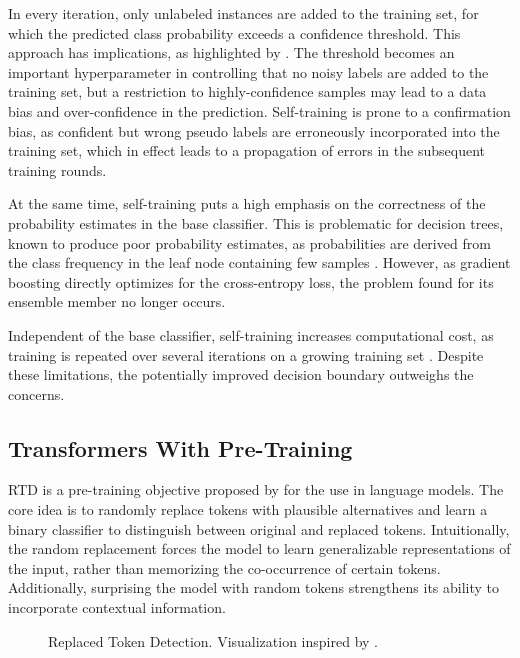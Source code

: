 In every iteration, only unlabeled instances are added to the training set, for which the predicted class probability exceeds a confidence threshold. This approach has implications, as highlighted by \textcite[][32427]{chenDebiasedSelfTrainingSemiSupervised2022}. The threshold becomes an important hyperparameter in controlling that no noisy labels are added to the training set, but a restriction to highly-confidence samples may lead to a data bias and over-confidence in the prediction. Self-training is prone to a confirmation bias, as confident but wrong pseudo labels are erroneously incorporated into the training set, which in effect leads to a propagation of errors in the subsequent training rounds.

At the same time, self-training puts a high emphasis on the correctness of the probability estimates in the base classifier. This is problematic for decision trees, known to produce poor probability estimates, as probabilities are derived from the class frequency in the leaf node containing few samples \autocite[][357--358]{tanhaSemisupervisedSelftrainingDecision2017}. However, as gradient boosting directly optimizes for the cross-entropy loss, the problem found for its ensemble member no longer occurs.

Independent of the base classifier, self-training increases computational cost, as training is repeated over several iterations on a growing training set \autocite[][3841]{zophRethinkingPretrainingSelftraining2020}. Despite these limitations, the potentially improved decision boundary outweighs the concerns.

\subsection{Transformers With Pre-Training}\label{sec:extensions-to-transformer}

\gls{RTD} is a pre-training objective proposed by \textcite[][2--3]{clarkElectraPretrainingText2020} for the use in language models. The core idea is to randomly replace tokens with plausible alternatives and learn a binary classifier to distinguish between original and replaced tokens. Intuitionally, the random replacement forces the model to learn generalizable representations of the input, rather than memorizing the co-occurrence of certain tokens. Additionally, surprising the model with random tokens strengthens its ability to incorporate contextual information.

\begin{figure}[ht]
    \centering
    {\renewcommand\normalsize{\small}
        \normalsize
        }
    \caption[Replaced Token Detection]{Replaced Token Detection. Visualization inspired by \textcite[][3]{clarkElectraPretrainingText2020}.}
    \label{fig:random-token-replacement}
\end{figure}

